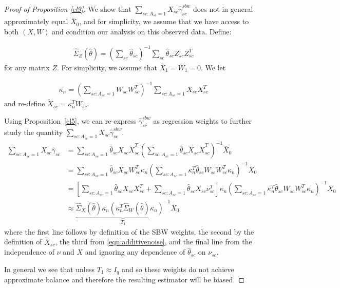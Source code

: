 \begin{proof}[Proof of Proposition \ref{cl9}]
    We show that $\sum_{sc: A_{sc} = 1}X_{sc}\hat{\gamma}^{sbw}_{sc}$ does not in general approximately equal $\bar{X}_0$, and for simplicity, we assume that we have access to both $(X, W)$ and condition our analysis on this observed data. Define:
    
    \begin{align*}
    \hat{\Sigma}_Z(\hat{\theta}) = (\sum_{sc} \hat{\theta}_{sc})^{-1}\sum_{sc}\hat{\theta}_{sc}Z_{sc}Z_{sc}^T
    \end{align*} 
    for any matrix $Z$. For simplicity, we assume that $\bar{X}_1 = \bar{W}_1 = 0$. We let 
    
    \begin{align*}
    \kappa_n = (\sum_{sc: A_{sc} = 1} W_{sc}W_{sc}^T)^{-1} \sum_{sc: A_{sc} = 1} X_{sc}X_{sc}^T
    \end{align*}
    and re-define $\tilde{X}_{sc} = \kappa_n^TW_{sc}$. 
    
    Using Proposition~\ref{cl5}, we can re-express $\hat{\gamma}^{sbw}_{sc}$ as regression weights to further study the quantity $\sum_{sc: A_{sc} = 1}X_{sc}\hat{\gamma}^{sbw}_{sc}$. 
    \begin{align}
        \nonumber\sum_{sc: A_{sc} = 1}X_{sc}\hat{\gamma}_{sc} &= \sum_{sc: A_{sc} = 1} \hat{\theta}_{sc}X_{sc}\tilde{X}_{sc}^T(\sum_{sc: A_{sc} = 1} \hat{\theta}_{sc}\tilde{X}_{sc}\tilde{X}_{sc}^T)^{-1}\bar{X}_0 \\
        \nonumber&= \sum_{sc: A_{sc} = 1} \hat{\theta}_{sc}X_{sc}W_{sc}^T\kappa_n(\sum_{sc: A_{sc} = 1} \kappa_n^T\hat{\theta}_{sc}W_{sc}W_{sc}^T\kappa_n)^{-1}\bar{X}_0\label{prop1a} \\
        \nonumber&= [\sum_{sc: A_{sc} = 1} \hat{\theta}_{sc}X_{sc}X_{sc}^T + \sum_{sc: A_{sc} = 1} \hat{\theta}_{sc}X_{sc}\nu_{sc}^T]\kappa_n(\sum_{sc: A_{sc} = 1} \kappa_n^T\hat{\theta}_{sc}W_{sc}W_{sc}^T\kappa_n)^{-1}\bar{X}_0\label{prop1a} \\
        \nonumber&\approx \underbrace{\hat{\Sigma}_X(\hat{\theta})\kappa_n(\kappa_n^T\hat{\Sigma}_W(\hat{\theta})\kappa_n)^{-1}}_{T_1}\bar{X}_0 \label{prop1d}
        \end{align}
    where the first line follows by definition of the SBW weights, the second by the definition of $\tilde{X}_{sc}$, the third from \eqref{eqn:additivenoise}, and the final line from the independence of $\nu$ and $X$ and ignoring any dependence of $\hat{\theta}_{sc}$ on $\nu_{sc}$.
    
    In general we see that unless $T_1 \approx I_q$ and so these weights do not achieve approximate balance and therefore the resulting estimator will be biased.
\end{proof}
